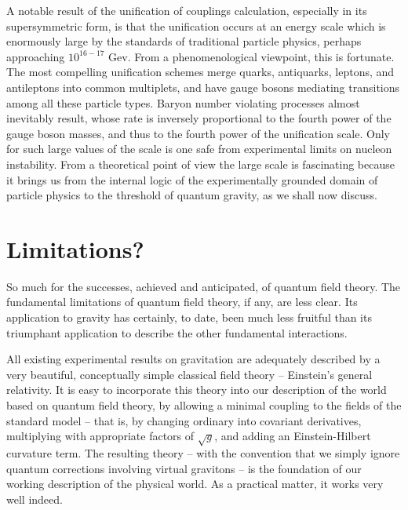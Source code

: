 \documentclass[aps,epsf]{revtex4}
\begin{document}
A notable result of the unification of couplings calculation,
especially in its supersymmetric form, is that the unification occurs
at an energy scale which is enormously large by the standards of
traditional particle physics, perhaps approaching $10^{16-17}$ Gev.
{}From a phenomenological viewpoint, this is fortunate.  The most
compelling unification schemes merge quarks, antiquarks, leptons, and
antileptons into common multiplets, and have gauge bosons mediating
transitions among all these particle types.  Baryon number violating
processes almost inevitably result, whose rate is inversely
proportional to the fourth power of the gauge boson masses, and thus
to the fourth power of the unification scale.  Only for such large
values of the scale is one safe from experimental limits on nucleon
instability.  From a theoretical point of view the large scale is
fascinating because it brings us from the internal logic of the
experimentally grounded domain of particle physics to the threshold of
quantum gravity, as we shall now discuss.





\section{Limitations?}


So much for the successes, achieved and anticipated, of quantum field
theory.  The fundamental limitations of quantum field theory, if any,
are less clear.  Its application to gravity has certainly, to date,
been much less fruitful than its triumphant application to describe
the other fundamental interactions.   

All existing experimental
results on gravitation are adequately described by a very beautiful,
conceptually simple classical field  theory -- Einstein's general
relativity.  It is easy to incorporate this  theory into our
description of the  world based on quantum field theory, by allowing a
minimal coupling to the fields of the standard model -- that is, by
changing ordinary into covariant derivatives, multiplying with
appropriate factors of $\sqrt g$, and adding an Einstein-Hilbert
curvature term.   
The resulting theory --  with the convention that we
simply ignore quantum corrections involving virtual gravitons -- is
the foundation of our working description of the physical world.  As a
practical matter, it works very well indeed.    
\end{document}
